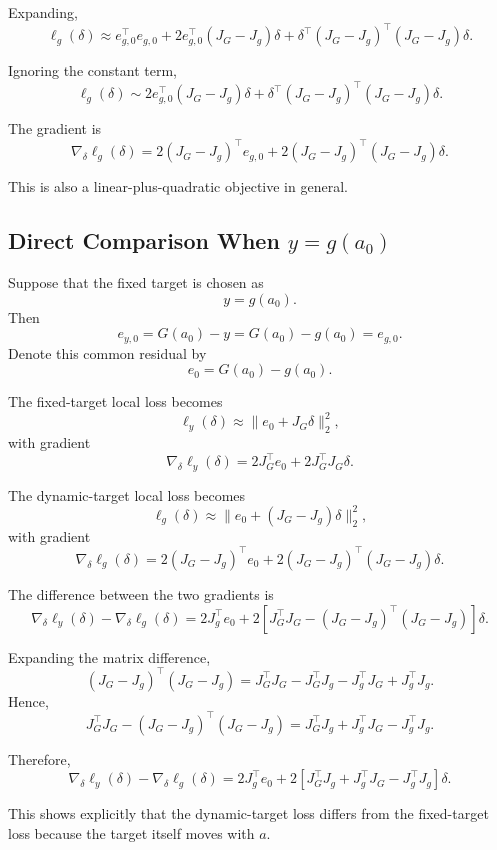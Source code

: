 \documentclass{article}
\begin{document}
Expanding,
\[
    \ell_g(\delta)
    \approx
    e_{g,0}^\top e_{g,0}
    +
    2e_{g,0}^\top (J_G-J_g)\delta
    +
    \delta^\top
    (J_G-J_g)^\top(J_G-J_g)\delta.
\]

Ignoring the constant term,
\[
    \ell_g(\delta)
    \sim
    2e_{g,0}^\top (J_G-J_g)\delta
    +
    \delta^\top
    (J_G-J_g)^\top(J_G-J_g)\delta.
\]

The gradient is
\[
    \boxed{
    \nabla_\delta \ell_g(\delta)
    =
    2(J_G-J_g)^\top e_{g,0}
    +
    2(J_G-J_g)^\top(J_G-J_g)\delta
    }.
\]

This is also a linear-plus-quadratic objective in general.

\subsection{Direct Comparison When \(y=g(a_0)\)}

Suppose that the fixed target is chosen as
\[
    y=g(a_0).
\]
Then
\[
    e_{y,0}=G(a_0)-y
    =
    G(a_0)-g(a_0)
    =
    e_{g,0}.
\]
Denote this common residual by
\[
    e_0=G(a_0)-g(a_0).
\]

The fixed-target local loss becomes
\[
    \ell_y(\delta)
    \approx
    \|e_0+J_G\delta\|_2^2,
\]
with gradient
\[
    \nabla_\delta \ell_y(\delta)
    =
    2J_G^\top e_0
    +
    2J_G^\top J_G\delta.
\]

The dynamic-target local loss becomes
\[
    \ell_g(\delta)
    \approx
    \|e_0+(J_G-J_g)\delta\|_2^2,
\]
with gradient
\[
    \nabla_\delta \ell_g(\delta)
    =
    2(J_G-J_g)^\top e_0
    +
    2(J_G-J_g)^\top(J_G-J_g)\delta.
\]

The difference between the two gradients is
\[
    \nabla_\delta \ell_y(\delta)-\nabla_\delta \ell_g(\delta)
    =
    2J_g^\top e_0
    +
    2\left[
    J_G^\top J_G
    -
    (J_G-J_g)^\top(J_G-J_g)
    \right]\delta.
\]

Expanding the matrix difference,
\[
    (J_G-J_g)^\top(J_G-J_g)
    =
    J_G^\top J_G
    -
    J_G^\top J_g
    -
    J_g^\top J_G
    +
    J_g^\top J_g.
\]
Hence,
\[
    J_G^\top J_G
    -
    (J_G-J_g)^\top(J_G-J_g)
    =
    J_G^\top J_g
    +
    J_g^\top J_G
    -
    J_g^\top J_g.
\]

Therefore,
\[
    \boxed{
    \nabla_\delta \ell_y(\delta)-\nabla_\delta \ell_g(\delta)
    =
    2J_g^\top e_0
    +
    2\left[
    J_G^\top J_g
    +
    J_g^\top J_G
    -
    J_g^\top J_g
    \right]\delta
    }.
\]

This shows explicitly that the dynamic-target loss differs from the fixed-target loss because the target itself moves with \(a\).
\end{document}

